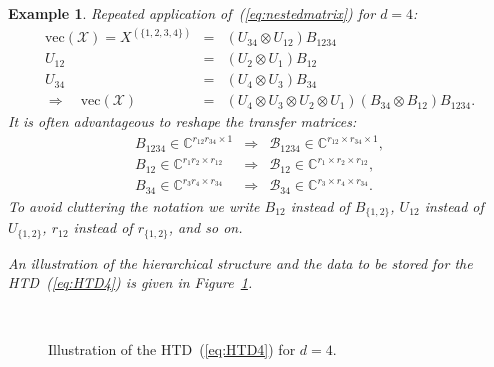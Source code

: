 \documentclass[11pt, a4paper]{article}
\newcommand{\calB}{\mathcal{B}}
\newcommand{\calX}{\mathcal{X}}
\newcommand{\C}{{\mathbb C}}
\newtheorem{example}[theorem]{\bf Example}
\begin{document}
\begin{example} \label{example:d4} Repeated application of~(\ref{eq:nestedmatrix}) for $d = 4$:
\begin{eqnarray}
 \text{vec}(\calX) = X^{(\{1,2,3,4\})} &=& (U_{34} \otimes U_{12}) B_{1234} \nonumber \\
 U_{12} &=& (U_2\otimes U_1) B_{12} \nonumber \\
 U_{34} &=& (U_4\otimes U_3) B_{34} \nonumber \\
\Rightarrow \quad {\text{vec}(\calX)} &{=} &
{(U_4\otimes U_3  \otimes U_2\otimes U_1) (B_{34}\otimes B_{12})  B_{1234}}. \label{eq:HTD4}
\end{eqnarray}
It is often advantageous to reshape the transfer matrices:
\begin{eqnarray*}
B_{1234} \in \C^{r_{12}r_{34}\times 1} & \Rightarrow &  \calB_{1234} \in \C^{r_{12}\times r_{34} \times 1}, \\
 B_{12} \in \C^{r_1r_2\times r_{12}} & \Rightarrow & \calB_{12} \in \C^{r_1\times r_2\times r_{12}}, \\
 B_{34} \in \C^{r_3r_4\times r_{34}} & \Rightarrow &  \calB_{34} \in \C^{r_3\times r_4\times r_{34}}. 
\end{eqnarray*}
To avoid cluttering the notation we write $B_{12}$ instead of $B_{\{1,2\}}$,
$U_{12}$ instead of $U_{\{1,2\}}$, $r_{12}$ instead of $r_{\{1,2\}}$,
and so on.

An illustration of the hierarchical structure and the data to be stored for the HTD~(\ref{eq:HTD4})
is given in Figure~\ref{fig:order4tensor}.
\end{example}
\begin{figure}
\begin{center}
  \resizebox{4.5cm}{!}{}
  $\qquad\qquad \qquad$
  \resizebox{4cm}{!}{}
\end{center}
\caption{Illustration of the HTD~(\ref{eq:HTD4}) for $d = 4$.} \label{fig:order4tensor}
\end{figure}
\end{document}
